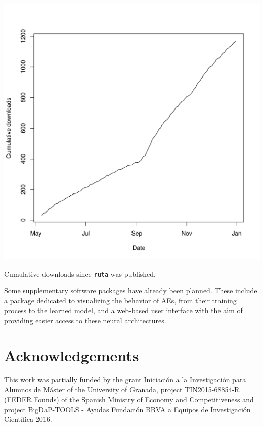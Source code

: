 \begin{marginfigure}
  \centering
  \includegraphics[width=\textwidth]{ruta_downloads.pdf}
  \caption{\label{p2fig.downloads}Cumulative downloads since \texttt{ruta} was published.}
\end{marginfigure}

Some supplementary software packages have already been planned. These include a package dedicated to visualizing the behavior of AEs, from their training process to the learned model, and a web-based user interface with the aim of providing easier access to these neural architectures.


\section*{Acknowledgements}
\label{p2sec.acknowledgements}

This work was partially funded by the grant Iniciaci{\'o}n a la Investigaci{\'o}n para Alumnos de M{\'a}ster of the University of Granada, project TIN2015-68854-R (FEDER Founds) of the Spanish Ministry of Economy and Competitiveness and project BigDaP-TOOLS - Ayudas
Fundaci{\'o}n BBVA a Equipos de Investigaci{\'o}n  Cient{\'i}fica
2016.

